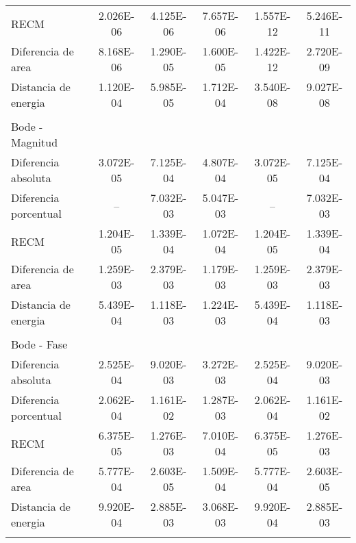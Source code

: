 {\begin{longtable}{l @{\extracolsep{\fill}} ccccc}
            RECM                         & \num{2.026E-06} & \num{4.125E-06} & \num{7.657E-06} & \num{1.557E-12} & \num{5.246E-11}  \\
            Diferencia de area           & \num{8.168E-06} & \num{1.290E-05} & \num{1.600E-05} & \num{1.422E-12} & \num{2.720E-09}  \\
            Distancia de energia         & \num{1.120E-04} & \num{5.985E-05} & \num{1.712E-04} & \num{3.540E-08} & \num{9.027E-08}  \\
            & & & & & \\
            Bode - Magnitud  &  &  &  &  &  \\ \cmidrule{1-1}
            Diferencia absoluta          & \num{3.072E-05} & \num{7.125E-04} & \num{4.807E-04} & \num{3.072E-05} & \num{7.125E-04}  \\
            Diferencia porcentual        & -- & \num{7.032E-03} & \num{5.047E-03} & -- & \num{7.032E-03}  \\
            RECM                         & \num{1.204E-05} & \num{1.339E-04} & \num{1.072E-04} & \num{1.204E-05} & \num{1.339E-04}  \\
            Diferencia de area           & \num{1.259E-03} & \num{2.379E-03} & \num{1.179E-03} & \num{1.259E-03} & \num{2.379E-03}  \\
            Distancia de energia         & \num{5.439E-04} & \num{1.118E-03} & \num{1.224E-03} & \num{5.439E-04} & \num{1.118E-03}  \\
            & & & & & \\
            Bode - Fase &  &  &  &  &  \\ \cmidrule{1-1}
            Diferencia absoluta          & \num{2.525E-04} & \num{9.020E-03} & \num{3.272E-03} & \num{2.525E-04} & \num{9.020E-03}  \\
            Diferencia porcentual        & \num{2.062E-04} & \num{1.161E-02} & \num{1.287E-03} & \num{2.062E-04} & \num{1.161E-02}  \\
            RECM                         & \num{6.375E-05} & \num{1.276E-03} & \num{7.010E-04} & \num{6.375E-05} & \num{1.276E-03}  \\
            Diferencia de area           & \num{5.777E-04} & \num{2.603E-05} & \num{1.509E-04} & \num{5.777E-04} & \num{2.603E-05}  \\
            Distancia de energia         & \num{9.920E-04} & \num{2.885E-03} & \num{3.068E-03} & \num{9.920E-04} & \num{2.885E-03}  \\
            & & & & & \\

\end{longtable}}

